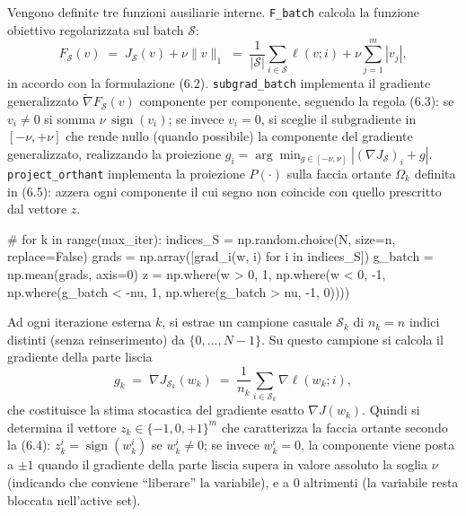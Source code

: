 \documentclass[a4paper,12pt]{article}
\begin{document}
Vengono definite tre funzioni ausiliarie interne. \texttt{F\_batch} calcola la funzione obiettivo regolarizzata sul batch $\mathcal{S}$:
\[
F_{\mathcal{S}}(v) \;=\; J_{\mathcal{S}}(v) + \nu\|v\|_1
\;=\; \frac{1}{|\mathcal{S}|}\sum_{i\in\mathcal{S}}\ell(v;i) + \nu\sum_{j=1}^{m}|v_j|,
\]
in accordo con la formulazione (6.2). \texttt{subgrad\_batch} implementa il gradiente generalizzato $\widetilde{\nabla} F_{\mathcal{S}}(v)$ componente per componente, seguendo la regola (6.3): se $v_i\neq 0$ si somma $\nu\,\operatorname{sign}(v_i)$; se invece $v_i=0$, si sceglie il subgradiente in $[-\nu,+\nu]$ che rende nullo (quando possibile) la componente del gradiente generalizzato, realizzando la proiezione $g_i = \arg\min_{g\in[-\nu,\nu]} |(\nabla J_{\mathcal{S}})_i + g|$. \texttt{project\_orthant} implementa la proiezione $P(\cdot)$ sulla faccia ortante $\Omega_k$ definita in (6.5): azzera ogni componente il cui segno non coincide con quello prescritto dal vettore $z$.

\begin{pythoncode}[title= Newton-L1]

#
    for k in range(max_iter):
        indices_S = np.random.choice(N, size=n, replace=False)
        grads = np.array([grad_i(w, i) for i in indices_S])
        g_batch = np.mean(grads, axis=0)
        z = np.where(w > 0, 1,
            np.where(w < 0, -1,
                np.where(g_batch < -nu, 1,
                    np.where(g_batch > nu, -1, 0))))
\end{pythoncode}
Ad ogni iterazione esterna $k$, si estrae un campione casuale $\mathcal{S}_k$ di $n_k=n$ indici distinti (senza reinserimento) da $\{0,\dots,N-1\}$. Su questo campione si calcola il gradiente della parte liscia
\[
g_k \;=\; \nabla J_{\mathcal{S}_k}(w_k) \;=\; \frac{1}{n_k}\sum_{i\in\mathcal{S}_k}\nabla\ell(w_k;i),
\]
che costituisce la stima stocastica del gradiente esatto $\nabla J(w_k)$. Quindi si determina il vettore $z_k\in\{-1,0,+1\}^m$ che caratterizza la faccia ortante secondo la (6.4): $z_k^i=\operatorname{sign}(w_k^i)$ se $w_k^i\neq 0$; se invece $w_k^i=0$, la componente viene posta a $\pm 1$ quando il gradiente della parte liscia supera in valore assoluto la soglia $\nu$ (indicando che conviene ``liberare'' la variabile), e a $0$ altrimenti (la variabile resta bloccata nell'active set).
\end{document}
